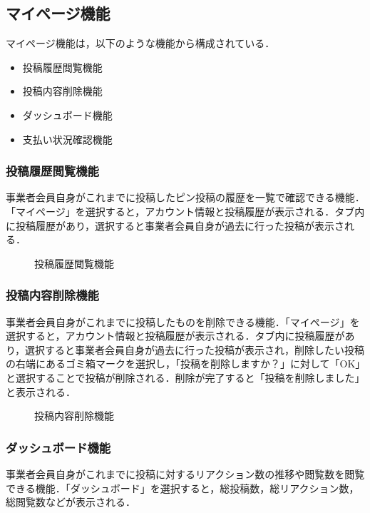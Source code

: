 \subsection{マイページ機能}

マイページ機能は，以下のような機能から構成されている．

\begin{itemize}
  \item 投稿履歴閲覧機能
  \item 投稿内容削除機能
  \item ダッシュボード機能
  \item 支払い状況確認機能
\end{itemize}


\subsubsection{投稿履歴閲覧機能}
事業者会員自身がこれまでに投稿したピン投稿の履歴を一覧で確認できる機能．「マイページ」を選択すると，アカウント情報と投稿履歴が表示される．タブ内に投稿履歴があり，選択すると事業者会員自身が過去に行った投稿が表示される．


\begin{figure}[H]
    \centering
    
    \caption{投稿履歴閲覧機能}
    \label{fig:mypage_bus1}
\end{figure}

\subsubsection{投稿内容削除機能}
事業者会員自身がこれまでに投稿したものを削除できる機能．「マイページ」を選択すると，アカウント情報と投稿履歴が表示される．タブ内に投稿履歴があり，選択すると事業者会員自身が過去に行った投稿が表示され，削除したい投稿の右端にあるゴミ箱マークを選択し，「投稿を削除しますか？」に対して「OK」と選択することで投稿が削除される．削除が完了すると「投稿を削除しました」と表示される．

\begin{figure}[H]
    \centering
    
    \caption{投稿内容削除機能}
    \label{fig:mypage_bus2}
\end{figure}

\subsubsection{ダッシュボード機能}
事業者会員自身がこれまでに投稿に対するリアクション数の推移や閲覧数を閲覧できる機能．「ダッシュボード」を選択すると，総投稿数，総リアクション数，総閲覧数などが表示される．


